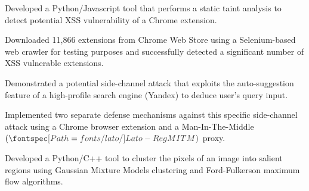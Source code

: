 \documentclass[]{deedy_format_Hien}
\begin{document}
\begin{minipage}[t]{0.66\textwidth}
\vspace{1mm}
\justify
\begin{tightemize}
\item Developed a Python/Javascript tool that performs a static taint analysis to detect potential XSS vulnerability of a Chrome extension.   
\item Downloaded 11,866 extensions from Chrome Web Store using a Selenium-based web crawler for testing purposes and successfully detected a significant number of XSS vulnerable extensions.  
\end{tightemize}
\vspace{\topsep}
\sectionsep


\vspace{1mm}
\justify
\begin{tightemize}
\item Demonstrated a potential side-channel attack that exploits the auto-suggestion feature of a high-profile search engine (Yandex) to deduce user's query input. 
\item Implemented two separate defense mechanisms against this specific side-channel attack using a Chrome browser extension and a Man-In-The-Middle $(\custombold{MITM})$ proxy. 
\end{tightemize}
\vspace{\topsep}
\sectionsep


\vspace{1mm}
\justify
\begin{tightemize}
\item Developed a Python/C++ tool to cluster the pixels of an image into salient regions using Gaussian Mixture Models clustering and Ford-Fulkerson maximum flow algorithms. 
\end{tightemize}
\vspace{\topsep}
\sectionsep
%
%
\end{minipage} 
\end{document}
